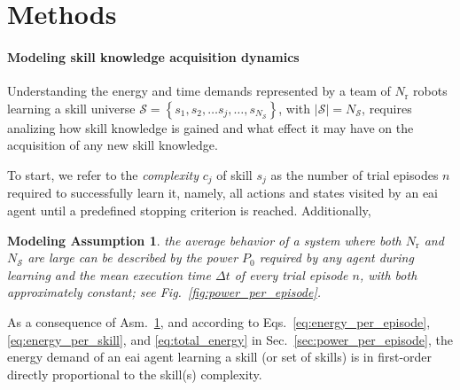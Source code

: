 \documentclass[12pt]{article}
\renewcommand{\emph}[1]{\textit{#1}}
\newtheorem{assumption}{Modeling Assumption}
\begin{document}
\section*{Methods}\label{sec:methods}

\paragraph*{Modeling skill knowledge acquisition dynamics}\label{sec:knowledge_dynamics_model}
Understanding the energy and time demands represented by a team of $N_\mathrm{r}$ robots learning a skill universe $\mathcal{S}=\left\lbrace s_1,s_2,\ldots s_j,\ldots, s_{N_\mathcal{S}}\right\rbrace$, with $|\mathcal{S}| = N_\mathcal{S}$, requires analizing how skill knowledge is gained and what effect it may have on the acquisition of any new skill knowledge. 

To start, we refer to the \emph{complexity} $c_j$ of skill $ s_j $ as the number of trial episodes $n$ required to successfully learn it, namely, all actions and states visited by an \ac{eai} agent until a predefined stopping criterion is reached. Additionally,
\begin{tcolorbox}
	\begin{assumption}\label{assumption:power_and_episode_time}
		the average behavior of a system where both $N_\mathrm{r}$ and $N_\mathcal{S}$ are large can be described by the power $P_0$ required by any agent during learning and the mean execution time $\Delta t$ of every trial episode $n$, with both approximately constant; see Fig.~\ref{fig:power_per_episode}.
	\end{assumption}
\end{tcolorbox}
\noindent As a consequence of Asm.~\ref{assumption:power_and_episode_time}, and according to Eqs.~\eqref{eq:energy_per_episode},\eqref{eq:energy_per_skill}, and \eqref{eq:total_energy} in Sec.~\ref{sec:power_per_episode}, the energy demand of an \ac{eai} agent learning a skill (or set of skills) is in first-order directly proportional to the skill(s) complexity.
\end{document}
